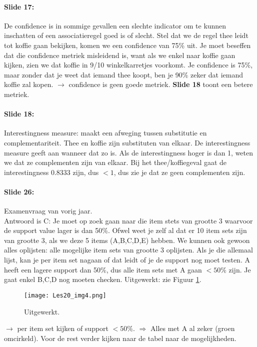 \documentclass[10pt,a4paper]{report}
\begin{document}
\paragraph{Slide 17:}De confidence is in sommige gevallen een slechte indicator om te kunnen inschatten of een associatieregel goed is of slecht. Stel dat we de regel thee leidt tot koffie gaan bekijken, komen we een confidence van 75\% uit. Je moet beseffen dat die confidence metriek misleidend is, want als we enkel naar koffie gaan kijken, zien we dat koffie in 9/10 winkelkarretjes voorkomt. Je confidence is 75\%, maar zonder dat je weet dat iemand thee koopt, ben je 90\% zeker dat iemand koffie zal kopen. $\rightarrow$ confidence is geen goede metriek. \textbf{Slide 18} toont een betere metriek.

\paragraph{Slide 18:}Interestingness measure: maakt een afweging tussen substitutie en complementariteit. Thee en koffie zijn substituten van elkaar. De interestingness measure geeft aan wanneer dat zo is. Als de interestingness hoger is dan 1, weten we dat ze complementen zijn van elkaar. Bij het thee/koffiegeval gaat de interestingness 0.8333 zijn, dus $< 1$, dus zie je dat ze geen complementen zijn.

\paragraph{Slide 26:}Examenvraag van vorig jaar.\\
Antwoord is C: Je moet op zoek gaan naar die item stets van grootte 3 waarvoor de support value lager is dan 50\%. Ofwel weet je zelf al dat er 10 item sets zijn van grootte 3, als we deze 5 items (A,B,C,D,E) hebben. We kunnen ook gewoon alles oplijsten: alle mogelijke item sets van grootte 3 oplijsten. Als je die allemaal lijst, kan je per item set nagaan of dat leidt of je de support nog moet testen. A heeft een lagere support dan 50\%, dus alle item sets met A gaan $< 50\%$ zijn. Je gaat enkel {B,C,D} nog moeten checken.
Uitgewerkt: zie Figuur \ref{Les20_4}.

\begin{figure}[ht!]
\centering
\texttt{[image: Les20\_img4.png]}
\caption{Uitgewerkt. \label{Les20_4}}
\end{figure}

$\rightarrow$ per item set kijken of support $< 50\%$. $\Rightarrow$ Alles met A al zeker (groen omcirkeld). Voor de rest verder kijken naar de tabel naar de mogelijkheden.
\end{document}
